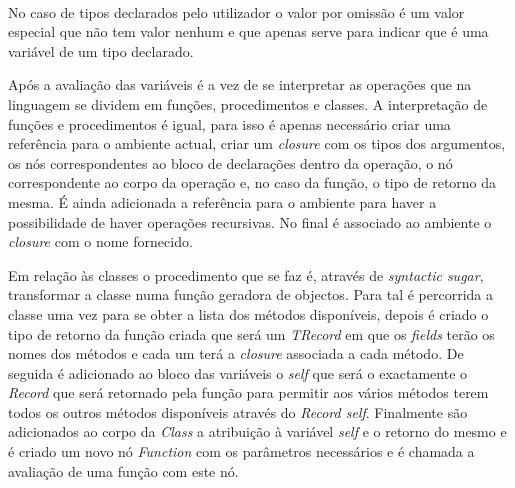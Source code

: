 \\

No caso de tipos declarados pelo utilizador o valor por omissão é um valor 
especial que não tem valor nenhum e que apenas serve para indicar que é uma 
variável de um tipo declarado. 

Após a avaliação das variáveis é a vez de se interpretar as operações que na 
linguagem se dividem em funções, procedimentos e classes. A interpretação de 
funções e procedimentos é igual, para isso é apenas necessário criar uma 
referência para o ambiente actual, criar um \emph{closure} com os tipos dos 
argumentos, os nós correspondentes ao bloco de declarações dentro da operação, 
o nó correspondente ao corpo da operação e, no caso da função, o tipo de 
retorno da mesma. É ainda adicionada a referência para o ambiente para haver 
a possibilidade de haver operações recursivas. No final é associado ao 
ambiente o \emph{closure} com o nome fornecido.
  
Em relação às classes o procedimento que se faz é, através de \emph{syntactic 
sugar}, transformar a classe numa função geradora de objectos. Para tal é 
percorrida a classe uma vez para se obter a lista dos métodos disponíveis, 
depois é criado o tipo de retorno da função criada que será um \emph{TRecord} 
em que os \emph{fields} terão os nomes dos métodos e cada um terá a 
\emph{closure} associada a cada método. De seguida é adicionado ao bloco das 
variáveis o \emph{self} que será o exactamente o \emph{Record} que será 
retornado pela função para permitir aos vários métodos terem todos os outros 
métodos disponíveis através do \emph{Record self}. Finalmente são adicionados 
ao corpo da \emph{Class} a atribuição à variável \emph{self} e o retorno do 
mesmo e é criado um novo nó \emph{Function} com os parâmetros necessários e é 
chamada a avaliação de uma função com este nó.

